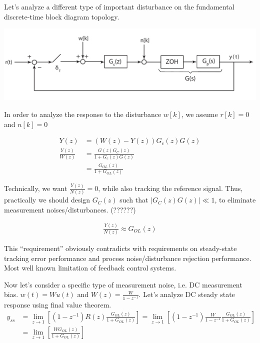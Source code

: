 \documentclass[twoside]{article}
\begin{document}
Let's analyze a different type of important disturbance on the fundamental 
discrete-time block diagram topology. 

\begin{center}
\begin{minipage}[h]{\linewidth}
    \begin{center}
      \includegraphics[width=\textwidth]{noise}
    \end{center}
\end{minipage}
\end{center}

In order to analyze the response to the disturbance $w[k]$, we assume 
$r[k] = 0$ and $n[k] = 0$ 

\begin{align*}
Y(z) &= ( W(z) -Y(z) ) G_c(z) G(z)
\\
\frac{Y(z)}{W(z)} &= \frac{G(z) G_C(z)}{1 + G_c(z) G(z)}
\\
&= \frac{G_{OL} (z)}{1 + G_{OL}(z)}
\end{align*}

Technically, we want $\frac{Y(z)}{N(z)} = 0$, while also tracking
the reference signal. Thus, practically we should design $G_C(z)$ such
that $|G_C(z) G(z)| \ll 1$, to eliminate measurement
noises/disturbances. (??????) 

\begin{align*}
\frac{Y(z)}{N(z)} \approx {G_{OL}(z)}
\end{align*}

This ``requirement'' obviously contradicts with 
requirements on steady-state tracking error performance
and process noise/disturbance rejection performance. Most well
known limitation of feedback control systems.

Now let's consider a specific type of measurement noise, i.e. DC measurement bias.  
$w(t) = W u(t)$ and $W(z) = \frac{W}{1 - z^{-1}}$. Let's
analyze DC steady state response using final value theorem.
%
\begin{align*}
y_{ss} &= \lim_{z\to1} \left[ (1 - z^{-1}) R(z) \frac{ G_{OL}(z) } {
  1 + G_{OL}(z) } \right] = \lim_{z\to1} \left[ (1 - z^{-1}) \frac{W}{1-z^{-1}} \frac{ G_{OL}(z) } {
  1 + G_{OL}(z) } \right]  
\\
&= \lim_{z\to1} \left[ \frac{ W G_{OL}(z) }{1 + G_{OL}(z) } \right]  
\end{align*}
\end{document}
